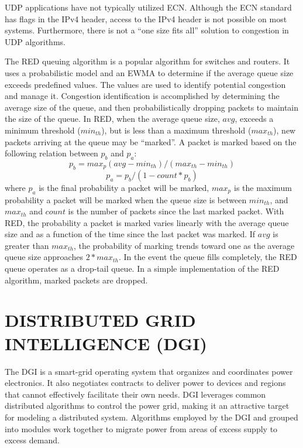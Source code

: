 UDP applications have not typically utilized \ac{ECN}.
Although the \ac{ECN} standard has flags in the IPv4 header, access to the IPv4 header is not possible on most systems.
Furthermore, there is not a ``one size fits all'' solution to congestion in UDP algorithms.

The \ac{RED} queuing algorithm is a popular algorithm for switches and routers.
It uses a probabilistic model and an \ac{EWMA} to determine if the average queue size exceeds predefined values.
The values are used to identify potential congestion and manage it.
Congestion identification is accomplished by determining the average size of the queue, and then probabilistically dropping packets to maintain the size of the queue.
In \ac{RED}, when the average queue size, $avg$, exceeds a minimum threshold ($min_{th}$), but is less than a maximum threshold ($max_{th}$), new packets arriving at the queue may be ``marked''.
A packet is marked based on the following relation between $p_{b}$ and $p_{a}$:
\begin{equation}
p_{b} = max_p (avg - min_{th}) / (max_{th}-min_{th})
\end{equation}
\begin{equation}
p_{a} = p_{b} / (1-count * p_b)
\end{equation}
where $p_{a}$ is the final probability a packet will be marked, $max_p$ is the maximum probability a packet will be marked when the queue size is between $min_{th}$, and $max_{th}$ and $count$ is the number of packets since the last marked packet.
With \ac{RED}, the probability a packet is marked varies linearly with the average queue size and as a function of the time since the last packet was marked.
If $avg$ is greater than $max_{th}$, the probability of marking trends toward one as the average queue size approaches $2*max_{th}$.
In the event the queue fills completely, the \ac{RED} queue operates as a drop-tail queue.
In a simple implementation of the \ac{RED} algorithm, marked packets are dropped.

\section{DISTRIBUTED GRID INTELLIGENCE (DGI)}

The DGI is a smart-grid operating system that organizes and coordinates power electronics.
It also negotiates contracts to deliver power to devices and regions that cannot effectively facilitate their own needs.
DGI leverages common distributed algorithms to control the power grid, making it an attractive target for modeling a distributed system.
Algorithms employed by the \ac{DGI} and grouped into modules work together to migrate power from areas of excess supply to excess demand.


